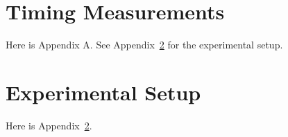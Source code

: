 \documentclass[dissertation, proposal]{bsu-cs}  %
\begin{document}

\appendix


\chapter{Timing Measurements}\label{app:Timing}

Here is Appendix A. See Appendix~\ref{app:Setup} for the experimental setup.


\chapter{Experimental Setup}\label{app:Setup}

Here is Appendix~\ref{app:Setup}.


\finish  %
\end{document}
